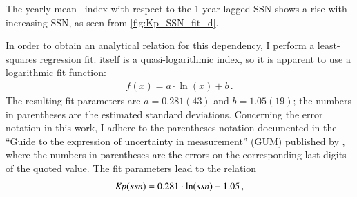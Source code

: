 The yearly mean \Kp~index with respect to the 1-year lagged SSN shows a rise with increasing SSN, as seen from \autoref{fig:Kp_SSN_fit_d}.
\begin{figure}[b!]
\end{figure}
In order to obtain an analytical relation for this dependency, I perform a least-squares regression fit. \Kp{} itself is a quasi-logarithmic index, so it is apparent to use a logarithmic fit function:
\begin{align}
	f(x) = a \cdot \ln(x) + b	\,.	\label{eq:log_fit_function}
\end{align}
The resulting fit parameters are $a = 0.281(43)$ and $b = 1.05(19)$; the numbers in parentheses are the estimated standard deviations. Concerning the error notation in this work, I adhere to the parentheses notation documented in the ``Guide to the expression of uncertainty in measurement'' (GUM) published by \citet{GUM2008}, where the numbers in parentheses are the errors on the corresponding last digits of the quoted value. The fit parameters lead to the relation
\begin{align}
	\textit{Kp}(ssn) = 0.281 \cdot \ln(ssn) + 1.05	\,,	\label{eq:kp_ssn_relation}
\end{align}
